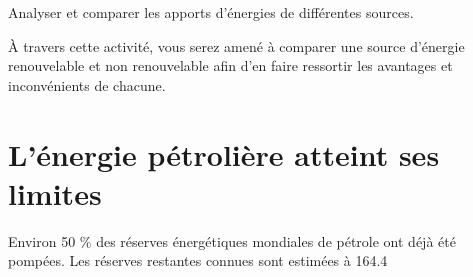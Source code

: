 \documentclass[10pt,fleqn]{article} %
\begin{document}

\begin{obj}
Analyser et comparer les apports d’énergies de différentes sources. 

À travers cette activité, vous serez amené à comparer une source
d’énergie renouvelable et non renouvelable afin d’en faire ressortir les
avantages et inconvénients de chacune.
\end{obj}
\section{L'énergie pétrolière atteint ses limites}
 Environ 50 \% des réserves énergétiques mondiales de pétrole ont déjà
été pompées. Les réserves restantes connues sont estimées à \SI{164.4}{
}
\end{document}
